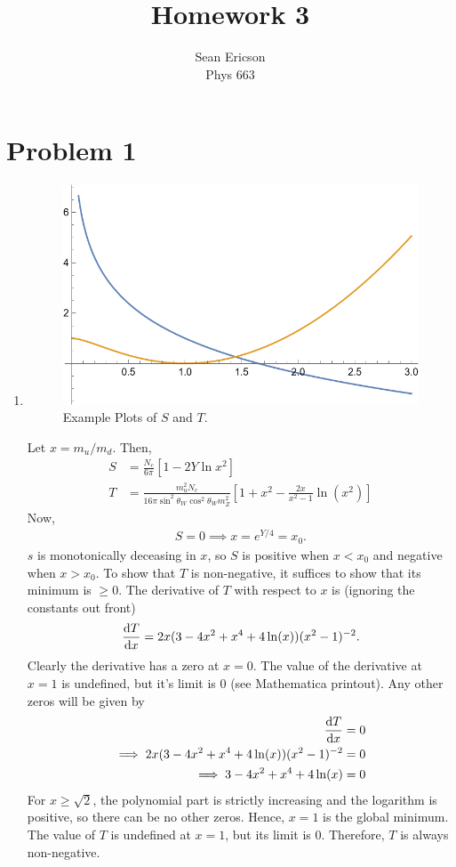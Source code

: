 \documentclass[12pt]{article}
\begin{document}
\title{Homework 3}
\author{Sean Ericson \\ Phys 663}
\maketitle

\section*{Problem 1}
\begin{enumerate}[label=(\alph*)]
    \item 
    \begin{figure}[h]
        \includegraphics[scale=0.75]{S_T.PNG}
        \centering
        \caption{Example Plots of $S$ and $T$.}
        \label{fig1}
    \end{figure}
    Let $x = m_u / m_d$. Then,
    \begin{align*}
        S &= \frac{N_c}{6\pi}\left[1 - 2Y\ln x^2\right] \\
        T &= \frac{m_u^2N_c}{16\pi\sin^2\theta_W\cos^2\theta_Wm_Z^2}\left[1 + x^2 - \frac{2x}{x^2 - 1}\ln(x^2)\right]
    \end{align*}
    Now,
    \begin{align*}
        S = 0 \implies x = e^{Y/4} = x_0.
    \end{align*}
    $s$ is monotonically deceasing in $x$, so $S$ is positive when $x<x_0$ and negative when $x > x_0$. To show that $T$ is non-negative, it suffices to show that its minimum is $\ge 0$. The derivative of $T$ with respect to $x$ is (ignoring the constants out front)
    \[ \dv{T}{x} = 2x(3 - 4x^2 + x^4 + 4\ln(x))(x^2 - 1)^{-2}. \]
    Clearly the derivative has a zero at $x=0$. The value of the derivative at $x=1$ is undefined, but it's limit is 0 (see Mathematica printout). Any other zeros will be given by
    \begin{align*}
        \dv{T}{x} &= 0 \\
        \implies 2x(3 - 4x^2 + x^4 + 4\ln(x))(x^2 - 1)^{-2} &= 0 \\
        \implies 3 - 4x^2 + x^4 + 4\ln(x) &= 0
    \end{align*}
    For $x \ge\sqrt{2}$, the polynomial part is strictly increasing and the logarithm is positive, so there can be no other zeros. Hence, $x=1$ is the global minimum. The value of $T$ is undefined at $x=1$, but its limit is 0. Therefore, $T$ is always non-negative.
    

\end{enumerate}
\end{document}
